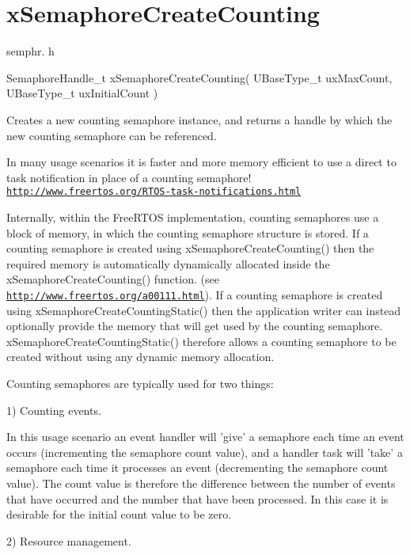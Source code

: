 \hypertarget{group__xSemaphoreCreateCounting}{\section{x\-Semaphore\-Create\-Counting}
\label{group__xSemaphoreCreateCounting}
}
semphr. h 
\begin{DoxyPre}SemaphoreHandle\_t xSemaphoreCreateCounting( UBaseType\_t uxMaxCount, UBaseType\_t uxInitialCount )\end{DoxyPre}


Creates a new counting semaphore instance, and returns a handle by which the new counting semaphore can be referenced.

In many usage scenarios it is faster and more memory efficient to use a direct to task notification in place of a counting semaphore! \href{http://www.freertos.org/RTOS-task-notifications.html}{\tt http\-://www.\-freertos.\-org/\-R\-T\-O\-S-\/task-\/notifications.\-html}

Internally, within the Free\-R\-T\-O\-S implementation, counting semaphores use a block of memory, in which the counting semaphore structure is stored. If a counting semaphore is created using x\-Semaphore\-Create\-Counting() then the required memory is automatically dynamically allocated inside the x\-Semaphore\-Create\-Counting() function. (see \href{http://www.freertos.org/a00111.html}{\tt http\-://www.\-freertos.\-org/a00111.\-html}). If a counting semaphore is created using x\-Semaphore\-Create\-Counting\-Static() then the application writer can instead optionally provide the memory that will get used by the counting semaphore. x\-Semaphore\-Create\-Counting\-Static() therefore allows a counting semaphore to be created without using any dynamic memory allocation.

Counting semaphores are typically used for two things\-:

1) Counting events.

In this usage scenario an event handler will 'give' a semaphore each time an event occurs (incrementing the semaphore count value), and a handler task will 'take' a semaphore each time it processes an event (decrementing the semaphore count value). The count value is therefore the difference between the number of events that have occurred and the number that have been processed. In this case it is desirable for the initial count value to be zero.

2) Resource management.

